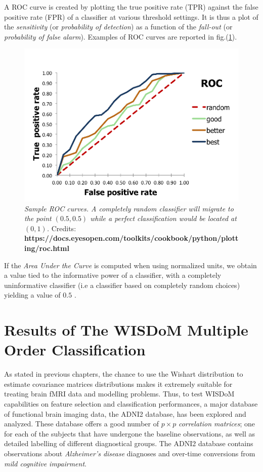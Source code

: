 \documentclass[12pt,openright,twoside,a4paper]{book}
\begin{document}
A ROC  curve is created by plotting the true positive rate (TPR) against the false positive rate (FPR) of a classifier at various threshold settings.
It is thus a plot of the \textit{sensitivity} (or \textit{probability of detection}) as a function of the \textit{fall-out} (or \textit{probability of false alarm}). 
Examples of ROC curves are reported in fig.(\ref{ADNI-roc}).

\begin{figure}[!h]
\centering
\includegraphics[scale=0.65]{roc-theory-small}
\caption{\textit{Sample ROC curves. A completely random classifier will migrate to the point $(0.5,0.5)$ while a perfect classification would be located at $(0,1)$.}
Credits: \textbf{https://docs.eyesopen.com/toolkits/cookbook/python/plotting/roc.html}}
\label{ADNI-roc}
\end{figure}

If the \textit{Area Under the Curve} is computed when using normalized units, we obtain a value tied to the informative power of a classifier, with a completely uninformative classifier (i.e a classifier based on completely random choices) yielding a value of $0.5$ \cite{ROC}.


\chapter{Results of The WISDoM Multiple Order Classification}

As stated in previous chapters, the chance to use the Wishart distribution to estimate covariance matrices distributions makes it extremely suitable for treating brain fMRI data and modelling problems.
Thus, to test WISDoM capabilities on feature selection and classification performances, a major database of functional brain imaging data, the ADNI2  database, has been explored and analyzed.
These  database offers a good number of $p\times p$ \textit{correlation matrices}; one for each of the subjects that have undergone the baseline observations, as well as detailed labelling of different diagnostical groups.
The ADNI2 database contains observations about \textit{Alzheimer's disease} diagnoses and over-time conversions from \textit{mild cognitive impairment}.
\end{document}
